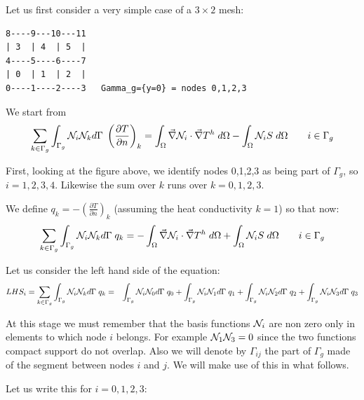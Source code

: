 Let us first consider a very simple case of a $3\times 2$ mesh:

\begin{verbatim}
8----9---10---11
| 3  | 4  | 5  |
4----5----6----7
| 0  | 1  | 2  |
0----1----2----3   Gamma_g={y=0} = nodes 0,1,2,3
\end{verbatim}



We start from 
\begin{equation}
\sum_{k \in \Gamma_g} \int_{\Gamma_g} {\mathcal{N}}_i {\mathcal{N}}_k d\Gamma \; 
\left(
\frac{\partial T}{\partial n}
\right)_k
=
\int_\Omega \vec\nabla {\mathcal{N}}_i \cdot \vec\nabla T^h \; d\Omega
- \int_\Omega {\mathcal{N}}_i S \; d\Omega
\qquad
i \in \Gamma_g
\label{eq:mizu1}
\end{equation}

First, looking at the figure above, we identify nodes 0,1,2,3 as 
being part of $\Gamma_g$, so $i=1,2,3,4$. Likewise the sum over $k$ 
runs over $k=0,1,2,3$.

We define $q_k= -\left(\frac{\partial T}{\partial n}\right)_k$ 
(assuming the heat conductivity $k=1$) 
so that now:
\[
\sum_{k \in \Gamma_g} \int_{\Gamma_g} {\mathcal{N}}_i {\mathcal{N}}_k d\Gamma \; 
q_k
=
-\int_\Omega \vec\nabla {\mathcal{N}}_i \cdot \vec\nabla T^h \; d\Omega
+ \int_\Omega {\mathcal{N}}_i S \; d\Omega
\qquad
i \in \Gamma_g
\]


Let us consider the left hand side of the equation:
\begin{eqnarray}
LHS_i= \sum_{k \in \Gamma_g} \int_{\Gamma_g} {\mathcal{N}}_i {\mathcal{N}}_k d\Gamma \; q_k
&=&
\int_{\Gamma_g} {\mathcal{N}}_i {\mathcal{N}}_0 d\Gamma \; q_0 +
\int_{\Gamma_g} {\mathcal{N}}_i {\mathcal{N}}_1 d\Gamma \; q_1 +
\int_{\Gamma_g} {\mathcal{N}}_i {\mathcal{N}}_2 d\Gamma \; q_2 +
\int_{\Gamma_g} {\mathcal{N}}_i {\mathcal{N}}_3 d\Gamma \; q_3 \nonumber
\end{eqnarray}

At this stage we must remember that the basis functions ${\mathcal{N}}_i$ are non zero only
in elements to which node $i$ belongs. For example ${\mathcal{N}}_1{\mathcal{N}}_3=0$ since the two 
functions compact support do not overlap. 
Also we will denote by $\Gamma_{ij}$ the part of $\Gamma_g$ made of the segment
between nodes $i$ and $j$. We will make use of this in what follows.



Let us write this for $i=0,1,2,3$:

